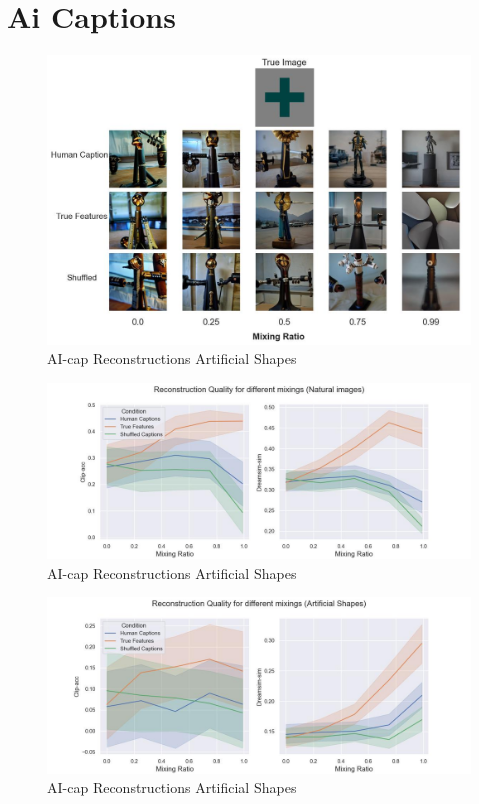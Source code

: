 \section{Ai Captions}
\begin{figure}[ht]
   \centering
   \includegraphics[width=1\textwidth]{plots/aicap_reconstruction_evolution_art_0.JPEG}
   \caption{AI-cap Reconstructions Artificial Shapes}\label{fig:aicap_reconstruction_evolution_art_0}
\end{figure}

\begin{figure}[ht]
   \centering
   \includegraphics[width=1\textwidth]{plots/aicap_reconstruction_quant_evolution_test.JPEG}
   \caption{AI-cap Reconstructions Artificial Shapes}\label{fig:aicap_reconstruction_quant_evolution_test}
\end{figure}

\begin{figure}[ht]
   \centering
   \includegraphics[width=1\textwidth]{plots/aicap_reconstruction_quant_evolution_art.JPEG}
   \caption{AI-cap Reconstructions Artificial Shapes}\label{fig:aicap_reconstruction_quant_evolution_art}
\end{figure}

